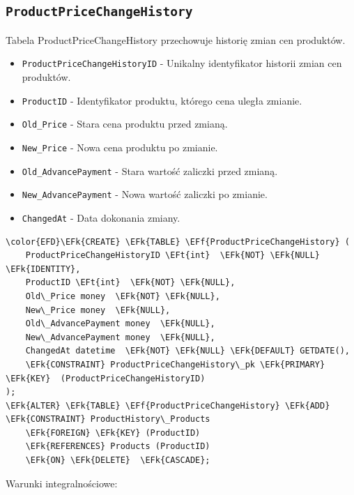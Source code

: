 \documentclass[11pt]{article}
\newcommand{\EFk}[1]{\textcolor{EFk}{\textbf{#1}}} %
\newcommand{\EFf}[1]{\textcolor{EFf}{#1}} %
\newcommand{\EFt}[1]{\textcolor{EFt}{\textbf{#1}}} %
\begin{document}
\subsection{\texttt{ProductPriceChangeHistory}}
\label{sec:org6b35b59}
Tabela ProductPriceChangeHistory przechowuje historię zmian cen produktów.
\begin{itemize}
\item \texttt{ProductPriceChangeHistoryID} - Unikalny identyfikator historii zmian cen produktów.
\item \texttt{ProductID} - Identyfikator produktu, którego cena uległa zmianie.
\item \texttt{Old\_Price} - Stara cena produktu przed zmianą.
\item \texttt{New\_Price} - Nowa cena produktu po zmianie.
\item \texttt{Old\_AdvancePayment} - Stara wartość zaliczki przed zmianą.
\item \texttt{New\_AdvancePayment} - Nowa wartość zaliczki po zmianie.
\item \texttt{ChangedAt} - Data dokonania zmiany.
\end{itemize}
\begin{Code}
\begin{Verbatim}
\color{EFD}\EFk{CREATE} \EFk{TABLE} \EFf{ProductPriceChangeHistory} (
    ProductPriceChangeHistoryID \EFt{int}  \EFk{NOT} \EFk{NULL} \EFk{IDENTITY},
    ProductID \EFt{int}  \EFk{NOT} \EFk{NULL},
    Old\_Price money  \EFk{NOT} \EFk{NULL},
    New\_Price money  \EFk{NULL},
    Old\_AdvancePayment money  \EFk{NULL},
    New\_AdvancePayment money  \EFk{NULL},
    ChangedAt datetime  \EFk{NOT} \EFk{NULL} \EFk{DEFAULT} GETDATE(),
    \EFk{CONSTRAINT} ProductPriceChangeHistory\_pk \EFk{PRIMARY} \EFk{KEY}  (ProductPriceChangeHistoryID)
);
\EFk{ALTER} \EFk{TABLE} \EFf{ProductPriceChangeHistory} \EFk{ADD} \EFk{CONSTRAINT} ProductHistory\_Products
    \EFk{FOREIGN} \EFk{KEY} (ProductID)
    \EFk{REFERENCES} Products (ProductID)
    \EFk{ON} \EFk{DELETE}  \EFk{CASCADE};
\end{Verbatim}
\end{Code}
Warunki integralnościowe:
\end{document}
